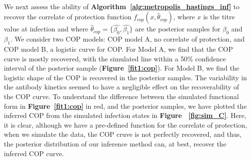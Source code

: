\documentclass{article}
\begin{document}
\paragraph{}We next assess the ability of \textbf{Algorithm~\ref{alg:metropolis_hastings_inf}} to recover the correlate of protection function $f_{cop}(x, \hat{\theta}_{cop})$, where $x$ is the titre value at infection and where $\hat{\theta}_{cop} = \{\hat{\beta_0}, \hat{\beta_1}\}$ are the posterior samples for $\beta_0$ and $\beta_1$. We consider two COP models: COP model A, no correlate of protection, and COP model B, a logistic curve for COP. For Model A, we find that the COP curve is mostly recovered, with the simulated line within a 50\% confidence interval of the posterior sample (\textbf{Figure~\ref{fit1:cop}}). For Model B, we find the logistic shape of the COP is recovered in the posterior samples. The variability in the antibody kinetics seemed to have a negligible effect on the recoverability of the COP curve. To understand the difference between the simulated functional form in \textbf{Figure~\ref{fit1:cop}} in red, and the posterior samples, we have plotted the inferred COP from the simulated infection states in \textbf{Figure ~\ref{fig:sim_C}}. Here, it is clear, although we have a pre-defined function for the correlate of protection, when we simulate the data, the COP cruve is not perfectly recovered, and thus, the posterior distribution of our inference method can, at best, recover the inferred COP curve.
\end{document}
